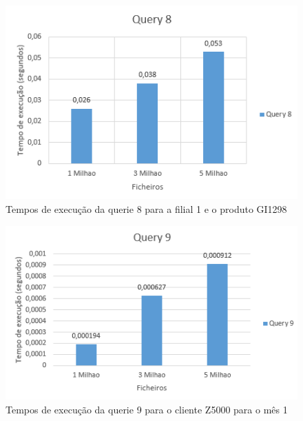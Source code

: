   	\begin{minipage}{0.45\linewidth}
  		\begin{figure}[H]
  			\includegraphics[width=\linewidth]{grafq8}
  			\caption{Tempos de execução da querie 8 para a filial 1 e o produto GI1298}
  		\end{figure}
  	\end{minipage}
  	\hspace{0.05\linewidth}
  	\begin{minipage}{0.45\linewidth}
  		\begin{figure}[H]
  			\includegraphics[width=\linewidth]{grafq9}
  			\caption{Tempos de execução da querie 9 para o cliente Z5000 para o mês 1}
  		\end{figure}
  	\end{minipage}
  	
